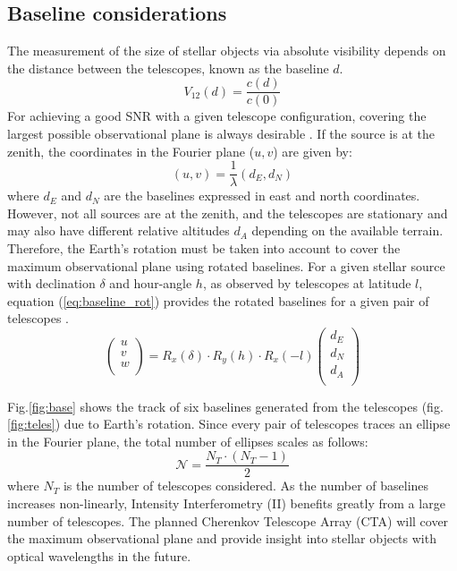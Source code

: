 \subsection{Baseline considerations}
The measurement of the size of stellar objects via absolute visibility depends on the distance between the telescopes, known as the baseline $d$.
\begin{equation}
	V_{12}(d) = \frac{c(d)}{c(0)}
	\label{eq:angular_size_meas}
\end{equation}
For achieving a good SNR with a given telescope configuration, covering the largest possible observational plane is always desirable \citep{acciari2020optical, abeysekara2020demonstration}. If the source is at the zenith, the coordinates in the Fourier plane ($u,v$) are given by:
\begin{equation}
	(u,v) = \frac{1}{\lambda} (d_E, d_N)
\end{equation}
where $d_E$ and $d_N$ are the baselines expressed in east and north coordinates. However, not all sources are at the zenith, and the telescopes are stationary and may also have different relative altitudes $d_A$ depending on the available terrain. Therefore, the Earth's rotation must be taken into account to cover the maximum observational plane using rotated baselines. For a given stellar source with declination $\delta$ and hour-angle $h$, as observed by telescopes at latitude $l$, equation (\ref{eq:baseline_rot}) provides the rotated baselines for a given pair of telescopes \citep[see e.g., eqs.~8--10 from][]{2020MNRAS.498.4577B}.
\begin{equation}
\begin{pmatrix} u\\ v\\ w\\ \end{pmatrix} = R_x(\delta) \cdot R_y(h) \cdot R_x(-l) \begin{pmatrix} d_E \\ d_N \\ d_A \\ \end{pmatrix}
	\label{eq:baseline_rot}
\end{equation}

Fig.\ref{fig:base} shows the track of six baselines generated from the telescopes (fig.\ref{fig:teles}) due to Earth's rotation. Since every pair of telescopes traces an ellipse in the Fourier plane, the total number of ellipses scales as follows: 
\begin{equation}
	\label{eq:N_telescopes}
	\mathcal{N} = \frac{N_T \cdot (N_T -1)}{2}
\end{equation}
where $N_T$ is the number of telescopes considered.
As the number of baselines increases non-linearly, Intensity Interferometry (II) benefits greatly from a large number of telescopes. The planned Cherenkov Telescope Array (CTA) will cover the maximum observational plane and provide insight into stellar objects with optical wavelengths in the future.

